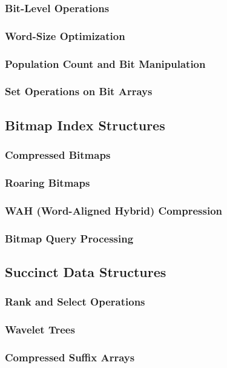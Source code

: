 \documentclass[12pt, oneside]{book}
\begin{document}
\subsubsection{Bit-Level Operations}
\subsubsection{Word-Size Optimization}
\subsubsection{Population Count and Bit Manipulation}
\subsubsection{Set Operations on Bit Arrays}

\subsection{Bitmap Index Structures}
\subsubsection{Compressed Bitmaps}
\subsubsection{Roaring Bitmaps}
\subsubsection{WAH (Word-Aligned Hybrid) Compression}
\subsubsection{Bitmap Query Processing}

\subsection{Succinct Data Structures}
\subsubsection{Rank and Select Operations}
\subsubsection{Wavelet Trees}
\subsubsection{Compressed Suffix Arrays}
\end{document}
